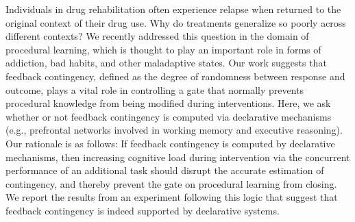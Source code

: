Individuals in drug rehabilitation often experience relapse when returned to the
original context of their drug use. Why do treatments generalize so poorly
across different contexts? We recently addressed this question in the domain of
procedural learning, which is thought to play an important role in forms of
addiction, bad habits, and other maladaptive states. Our work suggests that
feedback contingency, defined as the degree of randomness between response and
outcome, plays a vital role in controlling a gate that normally prevents
procedural knowledge from being modified during interventions. Here, we ask
whether or not feedback contingency is computed via declarative mechanisms
(e.g., prefrontal networks involved in working memory and executive reasoning).
Our rationale is as follows: If feedback contingency is computed by declarative
mechanisms, then increasing cognitive load during intervention via the
concurrent performance of an additional task should disrupt the accurate
estimation of contingency, and thereby prevent the gate on procedural learning
from closing. We report the results from an experiment following this logic that
suggest that feedback contingency is indeed supported by declarative systems.
